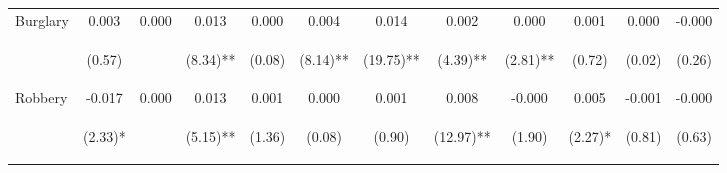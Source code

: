 \begin{tabular}{lccccccccccc}
\noalign{\smallskip}Burglary & 0.003 & 0.000 & 0.013 & 0.000 & 0.004 & 0.014 & 0.002 & 0.000 & 0.001 & 0.000 & -0.000\\
 & \begin{footnotesize}(0.57)\end{footnotesize} & \begin{footnotesize}\end{footnotesize} & \begin{footnotesize}(8.34)**\end{footnotesize} & \begin{footnotesize}(0.08)\end{footnotesize} & \begin{footnotesize}(8.14)**\end{footnotesize} & \begin{footnotesize}(19.75)**\end{footnotesize} & \begin{footnotesize}(4.39)**\end{footnotesize} & \begin{footnotesize}(2.81)**\end{footnotesize} & \begin{footnotesize}(0.72)\end{footnotesize} & \begin{footnotesize}(0.02)\end{footnotesize} & \begin{footnotesize}(0.26)\end{footnotesize}\\
\noalign{\smallskip}Robbery & -0.017 & 0.000 & 0.013 & 0.001 & 0.000 & 0.001 & 0.008 & -0.000 & 0.005 & -0.001 & -0.000\\
 & \begin{footnotesize}(2.33)*\end{footnotesize} & \begin{footnotesize}\end{footnotesize} & \begin{footnotesize}(5.15)**\end{footnotesize} & \begin{footnotesize}(1.36)\end{footnotesize} & \begin{footnotesize}(0.08)\end{footnotesize} & \begin{footnotesize}(0.90)\end{footnotesize} & \begin{footnotesize}(12.97)**\end{footnotesize} & \begin{footnotesize}(1.90)\end{footnotesize} & \begin{footnotesize}(2.27)*\end{footnotesize} & \begin{footnotesize}(0.81)\end{footnotesize} & \begin{footnotesize}(0.63)\end{footnotesize}\\

\end{tabular}
